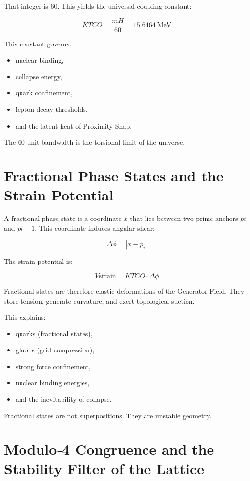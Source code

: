 \documentclass[reprint,amsmath,amssymb,aps,prl,floatfix]{revtex4-2}
\begin{document}
\begin{itemize}
That integer is 60.
\medskip
This yields the universal coupling constant:

\[
K{TCO} = \frac{mH}{60} = 15.6464\ \text{MeV}
\]

This constant governs:
\begin{itemize}
\item nuclear binding,  
\item collapse energy,  
\item quark confinement,  
\item lepton decay thresholds,  
\item and the latent heat of Proximity‑Snap.
\end{itemize}
\medskip

The 60‑unit bandwidth is the torsional limit of the universe.

\section{Fractional Phase States and the Strain Potential}
\medskip

A fractional phase state is a coordinate \(x\) that lies between two prime anchors \(pi\) and \(p{i+1}\).  
This coordinate induces angular shear:
\medskip

\[
\Delta \phi = |x - p_i|
\]
\medskip

The strain potential is:

\[
V{\text{strain}} = K{TCO} \cdot \Delta \phi
\]
\medskip

Fractional states are therefore elastic deformations of the Generator Field.  
They store tension, generate curvature, and exert topological suction.
\medskip

This explains:
\begin{itemize}
\item quarks (fractional states),  
\item gluons (grid compression),  
\item strong force confinement,  
\item nuclear binding energies,  
\item and the inevitability of collapse.
\end{itemize}
\medskip

Fractional states are not superpositions.  
They are unstable geometry.

\section{Modulo‑4 Congruence and the Stability Filter of the Lattice}


\end{itemize}
\end{document}
